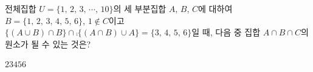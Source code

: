 전체집합 $U=\{1,\,2,\,3,\,\cdots,\,10\}$의 세 부분집합 $A$, $B$, $C$에 대하여 $B=\{1,\,2,\,3,\,4,\,5,\,6\}$, $1\notin C$이고 $\{(A\cup B)\cap B\}\cap\comp{\{(A\cap B)\cup A\}}=\{3,\,4,\,5,\,6\}$일 때, 다음 중 집합 $A\cap B\cap C$의 원소가 될 수 있는 것은?
\begin{choices32}{$2$}{$3$}{$4$}{$5$}{$6$}\end{choices32}
